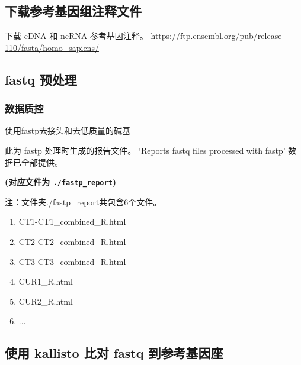\documentclass[
]{article}
\providecommand{\tightlist}{%
  \setlength{\itemsep}{0pt}\setlength{\parskip}{0pt}}
\begin{document}
\hypertarget{ux4e0bux8f7dux53c2ux8003ux57faux56e0ux7ec4ux6ce8ux91caux6587ux4ef6}{%
\subsection{下载参考基因组注释文件}\label{ux4e0bux8f7dux53c2ux8003ux57faux56e0ux7ec4ux6ce8ux91caux6587ux4ef6}}

下载 cDNA 和 ncRNA 参考基因注释。
\url{https://ftp.ensembl.org/pub/release-110/fasta/homo_sapiens/}

\hypertarget{fastq-ux9884ux5904ux7406}{%
\subsection{fastq 预处理}\label{fastq-ux9884ux5904ux7406}}

\hypertarget{ux6570ux636eux8d28ux63a7}{%
\subsubsection{数据质控}\label{ux6570ux636eux8d28ux63a7}}

使用fastp去接头和去低质量的碱基

此为 fastp 处理时生成的报告文件。
`Reports fastq files processed with fastp' 数据已全部提供。

\textbf{(对应文件为 \texttt{./fastp\_report})}

\begin{center}\begin{tcolorbox}[colback=gray!10, colframe=gray!50, width=0.9\linewidth, arc=1mm, boxrule=0.5pt]注：文件夹./fastp\_report共包含6个文件。

\begin{enumerate}\tightlist
\item CT1-CT1\_combined\_R.html
\item CT2-CT2\_combined\_R.html
\item CT3-CT3\_combined\_R.html
\item CUR1\_R.html
\item CUR2\_R.html
\item ...
\end{enumerate}\end{tcolorbox}
\end{center}

\hypertarget{ux4f7fux7528-kallisto-ux6bd4ux5bf9-fastq-ux5230ux53c2ux8003ux57faux56e0ux5ea7}{%
\subsection{使用 kallisto 比对 fastq 到参考基因座}\label{ux4f7fux7528-kallisto-ux6bd4ux5bf9-fastq-ux5230ux53c2ux8003ux57faux56e0ux5ea7}}
\end{document}
